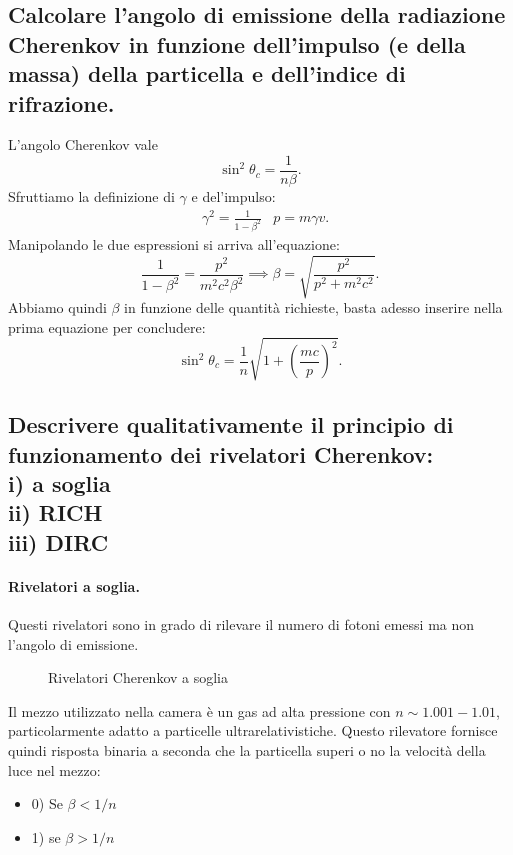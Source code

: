 \subsection[]{Calcolare l’angolo di emissione della radiazione Cherenkov in funzione dell’impulso (e della massa) della particella e dell’indice di rifrazione.
}
\label{sec:4.b.4}
L'angolo Cherenkov vale \[
	\sin^2\theta_{c}= \frac{1}{n \beta}
.\] 
Sfruttiamo la definizione di $\gamma$ e del'impulso:
\begin{align*}
	&\gamma^2 = \frac{1}{1-\beta^2}		&p = m\gamma v
.\end{align*}
Manipolando le due espressioni si arriva all'equazione:
\[
	\frac{1}{1-\beta^2} = \frac{p^2}{m^2c^2\beta^2}  \implies \beta = \sqrt{\frac{p^2}{p^2+m^2c^2}} 
.\] 
Abbiamo quindi $\beta$ in funzione delle quantità richieste, basta adesso inserire nella prima equazione per concludere:
\[
	\sin^2\theta_{c}=\frac{1}{n} \sqrt{1+\left( \frac{mc}{p} \right)^2} 
.\] 

\subsection[]{Descrivere qualitativamente il principio di funzionamento dei rivelatori Cherenkov: \\
	i) a soglia\\
	ii) RICH\\ 
	iii) DIRC
}
\label{sec:4.b.5}
\paragraph{Rivelatori a soglia.}%
Questi rivelatori sono in grado di rilevare il numero di fotoni emessi ma non l'angolo di emissione.
\begin{figure}[H]
    \centering
    \caption{Rivelatori Cherenkov a soglia}
    \label{fig:rivelatori-checklist-a-soglia}
\end{figure}
Il mezzo utilizzato nella camera è un gas ad alta pressione con $n \sim 1.001 - 1.01$, particolarmente adatto a particelle ultrarelativistiche. Questo rilevatore fornisce quindi risposta binaria a seconda che la particella superi o no la velocità della luce nel mezzo:
\begin{itemize}
	\item 0) Se $\beta < 1 /n$
	\item 1) se $\beta > 1 /n$
\end{itemize}
